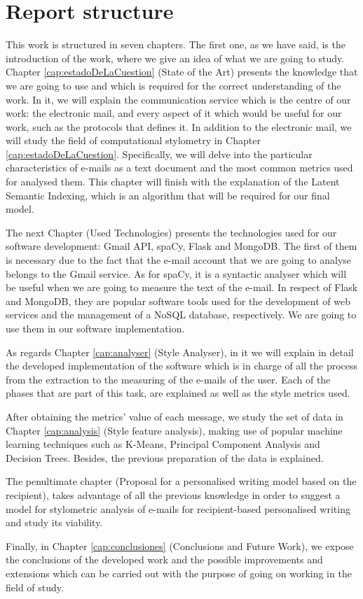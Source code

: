 \section{Report structure}\label{sect:structure}
This work is structured in seven chapters. The first one, as we have said, is the introduction of the work, where we give an idea of what we are going to study. Chapter \ref{cap:estadoDeLaCuestion} (State of the Art) presents the knowledge that we are going to use and which is required for the correct understanding of the work. In it, we will explain the communication service which is the centre of our work: the electronic mail, and every aspect of it  which would be useful for our work, such as the protocols that defines it. In addition to the electronic mail, we will study the field of computational stylometry in Chapter \ref{cap:estadoDeLaCuestion}. Specifically, we will delve into the particular characteristics of e-mails as a text document and the most common metrics used for analysed them. This chapter will finish with the explanation of the Latent Semantic Indexing, which is an algorithm that will be required for our final model.

The next Chapter (Used Technologies) presents the technologies used for our software development: Gmail API, spaCy, Flask and MongoDB. The first of them is necessary due to the fact that the e-mail account that we are going to analyse belongs to the Gmail service. As for spaCy, it is a syntactic analyser which will be useful when we are going to measure the text of the e-mail. In respect of Flask and MongoDB, they are popular software tools used for the development of web services and the management of a NoSQL database, respectively. We are going to use them in our software implementation.

As regards Chapter \ref{cap:analyser} (Style Analyser), in it we will explain in detail the developed implementation of the software which is in charge of all the process from the extraction to the measuring of the e-mails of the user. Each of the phases that are part of this task, are explained as well as the style metrics used.

After obtaining the metrics' value of each message, we study the set of data in Chapter \ref{cap:analysis} (Style feature analysis), making use of popular machine learning techniques such as K-Means, Principal Component Analysis and Decision Trees. Besides, the previous preparation of the data is explained.

The penultimate chapter (Proposal for a personalised writing model based on the recipient), takes advantage of all the previous knowledge in order to suggest a model for stylometric analysis of e-mails for recipient-based personalised writing and study its viability.

Finally, in Chapter \ref{cap:conclusiones} (Conclusions and Future Work), we expose the conclusions of the developed work and the possible improvements and extensions which can be carried out with the purpose of going on working in the field of study.